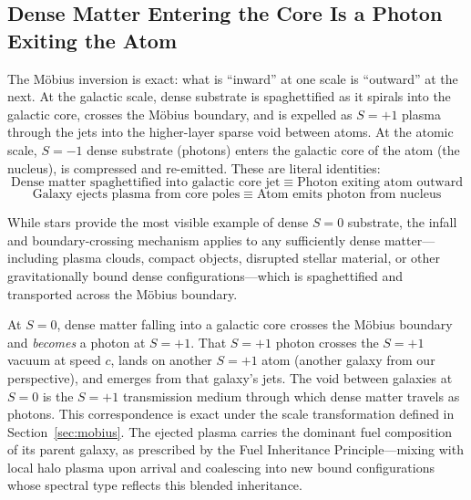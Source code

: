 \documentclass[11pt,letterpaper]{article}
\begin{document}
\subsection{Dense Matter Entering the Core Is a Photon Exiting the Atom}
\label{sec:same_motion}
The M\"obius inversion is exact: what is ``inward'' at one scale is ``outward'' at
the next. At the galactic scale, dense substrate is spaghettified as it spirals into
the galactic core, crosses the M\"obius boundary, and is expelled as $S{=}+1$
plasma through the jets into the higher-layer sparse void between atoms. At the
atomic scale, $S{=}{-1}$ dense substrate (photons) enters the galactic core of the
atom (the nucleus), is compressed and re-emitted. These are literal identities:
\begin{equation}
\text{Dense matter spaghettified into galactic core jet}
\;\equiv\;\text{Photon exiting atom outward}
\end{equation}
\begin{equation}
\text{Galaxy ejects plasma from core poles}
\;\equiv\;\text{Atom emits photon from nucleus}
\end{equation}

While stars provide the most visible example of dense $S{=}0$ substrate, the
infall and boundary-crossing mechanism applies to any sufficiently dense
matter---including plasma clouds, compact objects, disrupted stellar material, or
other gravitationally bound dense configurations---which is spaghettified and
transported across the M\"obius boundary.

At $S{=}0$, dense matter falling into a galactic core crosses the M\"obius boundary
and \textit{becomes} a photon at $S{=}+1$. That $S{=}+1$ photon crosses the
$S{=}+1$ vacuum at speed $c$, lands on another $S{=}+1$ atom (another galaxy from
our perspective), and emerges from that galaxy's jets. The void between galaxies at
$S{=}0$ is the $S{=}+1$ transmission medium through which dense matter travels as
photons. This correspondence is exact under the scale transformation defined in
Section~\ref{sec:mobius}. The ejected plasma carries the dominant fuel composition
of its parent galaxy, as prescribed by the Fuel Inheritance Principle---mixing with
local halo plasma upon arrival and coalescing into new bound configurations whose
spectral type reflects this blended inheritance.
\end{document}
